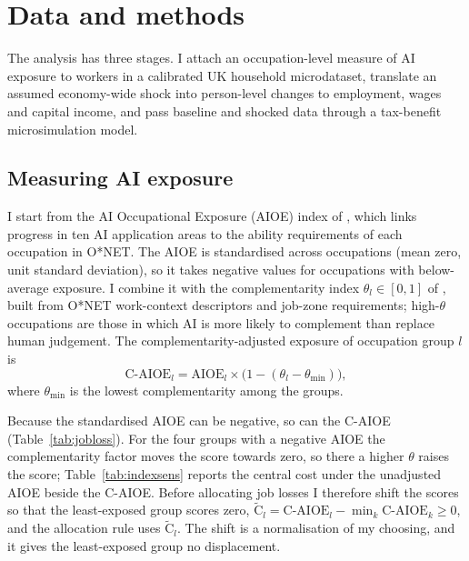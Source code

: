 \section{Data and methods}
\label{sec:methodology}

The analysis has three stages. I attach an occupation-level measure of AI exposure to workers in a calibrated UK household microdataset, translate an assumed economy-wide shock into person-level changes to employment, wages and capital income, and pass baseline and shocked data through a tax-benefit microsimulation model.

\subsection{Measuring AI exposure}
\label{sec:exposure}

I start from the AI Occupational Exposure (AIOE) index of \citet{felten2021}, which links progress in ten AI application areas to the ability requirements of each occupation in O*NET. The AIOE is standardised across occupations (mean zero, unit standard deviation), so it takes negative values for occupations with below-average exposure. I combine it with the complementarity index $\theta_l\in[0,1]$ of \citet{pizzinelli2023}, built from O*NET work-context descriptors and job-zone requirements; high-$\theta$ occupations are those in which AI is more likely to complement than replace human judgement. The complementarity-adjusted exposure of occupation group $l$ is
\begin{equation}
\label{eq:caioe}
\text{C-AIOE}_l = \text{AIOE}_l \times \bigl(1 - (\theta_l - \theta_{\min})\bigr),
\end{equation}
where $\theta_{\min}$ is the lowest complementarity among the groups.

Because the standardised AIOE can be negative, so can the C-AIOE (Table~\ref{tab:jobloss}). For the four groups with a negative AIOE the complementarity factor moves the score towards zero, so there a higher $\theta$ raises the score; Table~\ref{tab:indexsens} reports the central cost under the unadjusted AIOE beside the C-AIOE. Before allocating job losses I therefore shift the scores so that the least-exposed group scores zero, $\widetilde{\text{C}}_l = \text{C-AIOE}_l - \min_k \text{C-AIOE}_k \ge 0$, and the allocation rule uses $\widetilde{\text{C}}_l$. The shift is a normalisation of my choosing, and it gives the least-exposed group no displacement.

